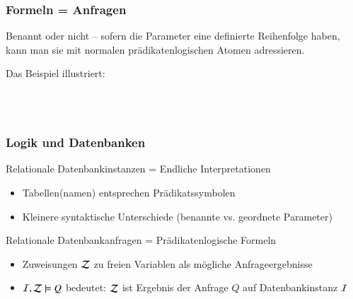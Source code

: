 \documentclass[aspectratio=1610,onlymath]{beamer}
\begin{document}
\begin{frame}\frametitle{Formeln = Anfragen}

Benannt oder nicht -- sofern die Parameter eine definierte Reihenfolge haben,
kann man sie mit normalen prädikatenlogischen Atomen adressieren.\medskip

\pause

Das Beispiel illustriert:
\begin{center}
\large
{}\\[1ex]
\\
\end{center}
\end{frame}

\begin{frame}\frametitle{Logik und Datenbanken}

\alert{Relationale Datenbankinstanzen = Endliche Interpretationen}
\begin{itemize}
\item Tabellen(namen) entsprechen Prädikatssymbolen
\item Kleinere syntaktische Unterschiede (benannte vs. geordnete Parameter)
\end{itemize}

\alert{Relationale Datenbankanfragen = Prädikatenlogische Formeln}
\begin{itemize}
\item Zuweisungen $\mathcal{Z}$ zu freien Variablen als mögliche Anfrageergebnisse
\item $\mathcal{I},\mathcal{Z}\models Q$ bedeutet: $\mathcal{Z}$ ist Ergebnis der Anfrage $Q$ auf Datenbankinstanz $\mathcal{I}$
\end{itemize}


\end{frame}
\end{document}
